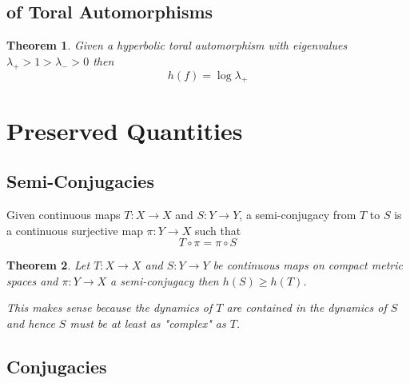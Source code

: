 \documentclass[11pt]{article}
\newenvironment{defin}
	{\begin{mdframed}[backgroundcolor=white, roundcorner=5pt, linewidth=1pt, linecolor=Green]
		\setlength{\parindent}{0pt}}
	{\end{mdframed}}
\newtheorem{theorem}{Theorem}[section]
\begin{document}
\subsection{of Toral Automorphisms}
\begin{theorem}
Given a hyperbolic toral automorphism with eigenvalues $\lambda_+ > 1 > \lambda_->0$ then
\[
	h(f)=\log \lambda_+
\]
\end{theorem}

\section{Preserved Quantities}

\subsection{Semi-Conjugacies}

\begin{defin}
Given continuous maps $T:X\to X$ and $S:Y\to Y$, a semi-conjugacy from $T$ to $S$ is a continuous surjective map $\pi:Y\to X$ such that
\[
T\circ \pi = \pi \circ S
\]

\begin{figure}[H]
	\centering
\end{figure}
\end{defin}

\begin{theorem}
Let $T:X\to X$ and $S:Y\to Y$ be continuous maps on compact metric spaces and $\pi:Y\to X$ a semi-conjugacy then $h(S)\geq h(T)$.
\begin{figure}[H]
	\centering
\end{figure}

This makes sense because the dynamics of $T$ are contained in the dynamics of $S$ and hence $S$ must be at least as "complex" as $T$.

\end{theorem}

\subsection{Conjugacies}
\end{document}
